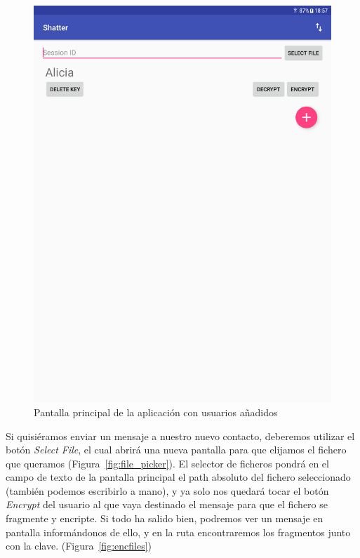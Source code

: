 \begin{figure}[ht]
  \centering
  \includegraphics[scale=0.2]{Figures/home_2}
  \decoRule
  \caption[Shatter (Pantalla principal con usuarios)]{Pantalla principal de la
  aplicación con usuarios añadidos}
  \label{fig:home_2}
\end{figure}

Si quisiéramos enviar un mensaje a nuestro nuevo contacto, deberemos utilizar
el botón \emph{Select File}, el cual abrirá una nueva pantalla para que
elijamos el fichero que queramos (Figura~\ref{fig:file_picker}). El selector de
ficheros pondrá en el campo de texto de la pantalla principal el path absoluto
del fichero seleccionado (también podemos escribirlo a mano), y ya solo nos
quedará tocar el botón \emph{Encrypt} del usuario al que vaya destinado el
mensaje para que el fichero se fragmente y encripte. Si todo ha salido bien,
podremos ver un mensaje en pantalla informándonos de ello, y en la ruta
 encontraremos los fragmentos junto con la clave.
(Figura~\ref{fig:encfiles})

